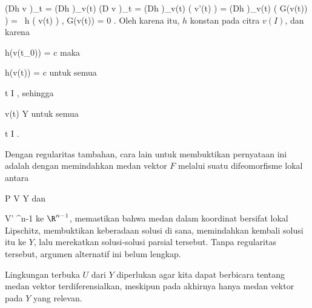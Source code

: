 {\mavergleichskettealign
{\vergleichskettealign
{ \left(Dh \circ v \right)_{t}
}
{ =} { \left(Dh  \right)_{v(t)} \circ  \left(D v \right)_{t}
}
{ =} { \left(Dh  \right)_{v(t)}  \left(  v'(t)  \right)
}
{ =} { \left(Dh  \right)_{v(t)}  \left(  G(v(t))  \right)
}
{ =} { \left\langle
{} \,  h  ( v(t) )  ,  G(v(t))    \right\rangle
}
}
{
\vergleichskettefortsetzungalign
{ =} { 0
}
{ } {}
{ } {}
{ } {}
}
{}{.}
Oleh karena itu, $h$ konstan pada citra $v( I)$, dan karena

\mavergleichskette
{\vergleichskette
{ h(v(t_0))
}
{ = }{ c
}
{  }{
}
{    }{
}
{   }{
}
}
{}{}{}
maka

\mavergleichskette
{\vergleichskette
{ h(v(t))
}
{ = }{ c
}
{  }{
}
{    }{
}
{   }{
}
}
{}{}{}
untuk semua

\mavergleichskette
{\vergleichskette
{ t
}
{ \in }{ I
}
{  }{
}
{    }{
}
{   }{
}
}
{}{}{,}
sehingga

\mavergleichskette
{\vergleichskette
{ v(t)
}
{ \in }{ Y
}
{  }{
}
{    }{
}
{   }{
}
}
{}{}{}
untuk semua

\mavergleichskette
{\vergleichskette
{ t
}
{ \in }{ I
}
{  }{
}
{    }{
}
{   }{
}
}
{}{}{.}

}

Dengan regularitas tambahan, cara lain untuk membuktikan pernyataan ini adalah dengan memindahkan medan vektor $F$ melalui suatu difeomorfisme lokal antara

\mavergleichskette
{\vergleichskette
{ P
}
{ \in }{ V
}
{ \subseteq }{ Y
}
{    }{
}
{   }{
}
}
{}{}{}
dan

\mavergleichskette
{\vergleichskette
{ V'
}
{ \subseteq }{ \R^{n-1}
}
{  }{
}
{    }{
}
{   }{
}
}
{}{}{}
ke $\R^{n-1}$, memastikan bahwa medan dalam koordinat bersifat lokal Lipschitz, membuktikan keberadaan solusi di sana, memindahkan kembali solusi itu ke $Y$, lalu merekatkan solusi-solusi parsial tersebut. Tanpa regularitas tersebut, argumen alternatif ini belum lengkap.

Lingkungan terbuka $U$ dari $Y$ diperlukan agar kita dapat berbicara tentang medan vektor terdiferensialkan, meskipun pada akhirnya hanya medan vektor pada $Y$ yang relevan.


